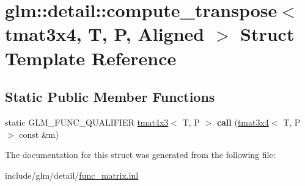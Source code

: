 \hypertarget{structglm_1_1detail_1_1compute__transpose_3_01tmat3x4_00_01T_00_01P_00_01Aligned_01_4}{}\section{glm\+:\+:detail\+:\+:compute\+\_\+transpose$<$ tmat3x4, T, P, Aligned $>$ Struct Template Reference}
\label{structglm_1_1detail_1_1compute__transpose_3_01tmat3x4_00_01T_00_01P_00_01Aligned_01_4}
\subsection*{Static Public Member Functions}
\begin{DoxyCompactItemize}
\item 
\mbox{\label{structglm_1_1detail_1_1compute__transpose_3_01tmat3x4_00_01T_00_01P_00_01Aligned_01_4_af5c3a491c6e6c97e761d8b16fdd8d61d}} 
static G\+L\+M\+\_\+\+F\+U\+N\+C\+\_\+\+Q\+U\+A\+L\+I\+F\+I\+ER \hyperlink{structglm_1_1tmat4x3}{tmat4x3}$<$ T, P $>$ {\bfseries call} (\hyperlink{structglm_1_1tmat3x4}{tmat3x4}$<$ T, P $>$ const \&m)
\end{DoxyCompactItemize}


The documentation for this struct was generated from the following file\+:\begin{DoxyCompactItemize}
\item 
include/glm/detail/\hyperlink{func__matrix_8inl}{func\+\_\+matrix.\+inl}\end{DoxyCompactItemize}
